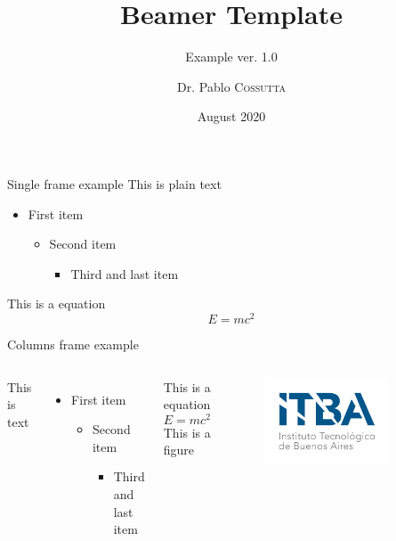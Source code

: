 \documentclass{beamer}
\title[Beamer Template]{Beamer Template}
\subtitle{Example \tiny{ver. 1.0}}
\author{Dr. Pablo \textsc{Cossutta}}
\institute[]{\textsc{Buenos Aires Technological Institute}}
\date{August 2020}
\begin{document}
\beamertemplatenavigationsymbolsempty %
\maketitle
\logo{}

\begin{frame}{Single frame example}
This is plain text
\begin{itemize}
	\item First item
	\begin{itemize}
		\item Second item
		\begin{itemize}
			\item Third and last item
		\end{itemize}
	\end{itemize}
\end{itemize}
This is a equation
\begin{equation*}
	E=mc^2
\end{equation*}
\end{frame}

\begin{frame}{Columns frame example}
\begin{columns}[c]
This is text
\begin{itemize}
	\item First item
	\begin{itemize}
		\item Second item
		\begin{itemize}
			\item Third and last item
		\end{itemize}
	\end{itemize}
\end{itemize}
This is a equation
\begin{equation*}
	E=mc^2
\end{equation*}
This is a figure
\begin{figure}
	\includegraphics[width=0.8\textwidth]{./figs/logo_itba.png}
\end{figure}
\end{columns}
\end{frame}
\end{document}
